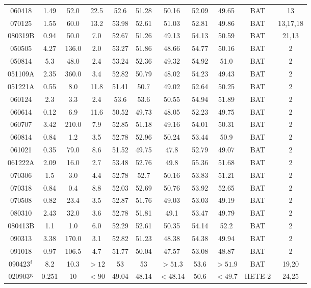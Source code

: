 \documentclass[12pt]{article}
\begin{document}
\begin{landscape}
\begin{longtable}{ccccccccccc}
060418 & 1.49 & 52.0 & 22.5 & 52.6 & 51.28 & 50.16 & 52.09 & 49.65 & BAT & 13 \\
070125 & 1.55 & 60.0 & 13.2 & 53.98 & 52.61 & 51.03 & 52.81 & 49.86 & BAT & 13,17,18 \\
080319B & 0.94 & 50.0 & 7.0 & 52.67 & 51.26 & 49.13 & 54.13 & 50.59 & BAT & 21,13 \\
050505 & 4.27 & 136.0 & 2.0 & 53.27 & 51.86 & 48.66 & 54.77 & 50.16 & BAT & 2 \\
050814 & 5.3 & 48.0 & 2.4 & 53.24 & 52.36 & 49.32 & 54.92 & 51.0 & BAT & 2 \\
051109A & 2.35 & 360.0 & 3.4 & 52.82 & 50.79 & 48.02 & 54.23 & 49.43 & BAT & 2 \\
051221A & 0.55 & 8.0 & 11.8 & 51.41 & 50.7 & 49.02 & 52.64 & 50.25 & BAT & 2 \\
060124 & 2.3 & 3.3 & 2.4 & 53.6 & 53.6 & 50.55 & 54.94 & 51.89 & BAT & 2 \\
060614 & 0.12 & 6.9 & 11.6 & 50.52 & 49.73 & 48.05 & 52.23 & 49.75 & BAT & 2 \\
060707 & 3.42 & 210.0 & 7.9 & 52.85 & 51.18 & 49.16 & 54.01 & 50.31 & BAT & 2 \\
060814 & 0.84 & 1.2 & 3.5 & 52.78 & 52.96 & 50.24 & 53.44 & 50.9 & BAT & 2 \\
061021 & 0.35 & 79.0 & 8.6 & 51.52 & 49.75 & 47.8 & 52.79 & 49.07 & BAT & 2 \\
061222A & 2.09 & 16.0 & 2.7 & 53.48 & 52.76 & 49.8 & 55.36 & 51.68 & BAT & 2 \\
070306 & 1.5 & 3.0 & 4.4 & 52.78 & 52.7 & 50.16 & 53.83 & 51.21 & BAT & 2 \\
070318 & 0.84 & 0.4 & 8.8 & 52.03 & 52.69 & 50.76 & 53.92 & 52.65 & BAT & 2 \\
070508 & 0.82 & 23.4 & 3.5 & 52.87 & 51.76 & 49.03 & 53.03 & 49.19 & BAT & 2 \\
080310 & 2.43 & 32.0 & 3.6 & 52.78 & 51.81 & 49.1 & 53.47 & 49.79 & BAT & 2 \\
080413B & 1.1 & 1.0 & 6.0 & 52.29 & 52.61 & 50.35 & 54.14 & 52.2 & BAT & 2 \\
090313 & 3.38 & 170.0 & 3.1 & 52.82 & 51.23 & 48.38 & 54.38 & 49.94 & BAT & 2 \\
091018 & 0.97 & 106.5 & 4.7 & 51.77 & 50.04 & 47.57 & 53.08 & 48.87 & BAT & 2 \\
\hline
090423$^{\rm f}$ & 8.2 & 10.3 & $>12$ & 53 & 53 & $>51.3$ & 53.6 & $>51.9$ & BAT & 19,20 \\
020903$^{\rm g}$ & 0.251 & 10 & $<90$ & 49.04 & 48.14 & $<48.14$ & 50.6 & $<49.7$ & HETE-2 & 24,25 \\

\end{longtable}
\end{landscape}
\end{document}
